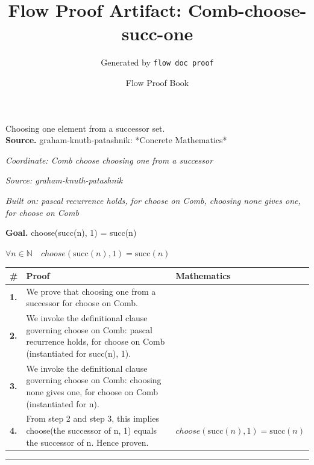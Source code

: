 \documentclass[11pt]{article}
\title{Flow Proof Artifact: Comb-choose-succ-one}
\author{Generated by \texttt{flow doc proof}}
\date{Flow Proof Book}
\theoremstyle{definition}
\begin{document}
\maketitle
Choosing one element from a successor set.\\[0.5em]
\textbf{Source.} graham-knuth-patashnik: *Concrete Mathematics*\\[0.5em]
\bigskip
{}\par
\smallskip\noindent\textit{Coordinate: Comb \cdot choose \cdot choosing one from a successor}\par
\smallskip\noindent\textit{Source: graham-knuth-patashnik}\par
\smallskip\noindent\textit{Built on: pascal recurrence holds, for choose on Comb, choosing none gives one, for choose on Comb}\par
\medskip
\noindent\textbf{Goal.} choose(succ(n), 1) = succ(n)\par
\noindent$\displaystyle \forall n \in \mathbb{N}\quad choose(\mathrm{succ}(n), 1) = \mathrm{succ}(n)$\par
\medskip
\noindent
\begin{tabular}{@{} >{\raggedright\arraybackslash}p{} >{\raggedright\arraybackslash}p{} >{\raggedleft\arraybackslash}p{} @{}}
\textbf{\#} & \textbf{Proof} & \textbf{Mathematics} \\
\midrule
\textbf{1.} & We prove that choosing one from a successor for choose on Comb. & \\[0.45em]
\textbf{2.} & We invoke the definitional clause governing choose on Comb: pascal recurrence holds, for choose on Comb (instantiated for succ(n), 1). & \\[0.45em]
\textbf{3.} & We invoke the definitional clause governing choose on Comb: choosing none gives one, for choose on Comb (instantiated for n). & \\[0.45em]
\textbf{4.} & From step 2 and step 3, this implies choose(the successor of n, 1) equals the successor of n. Hence proven. & $\displaystyle choose(\mathrm{succ}(n), 1) = \mathrm{succ}(n)$ \\[0.45em]
\bottomrule
\end{tabular}
\label{thm:Comb-choose-choosing_one_from_a_successor}
\par\medskip\hrule
\end{document}
